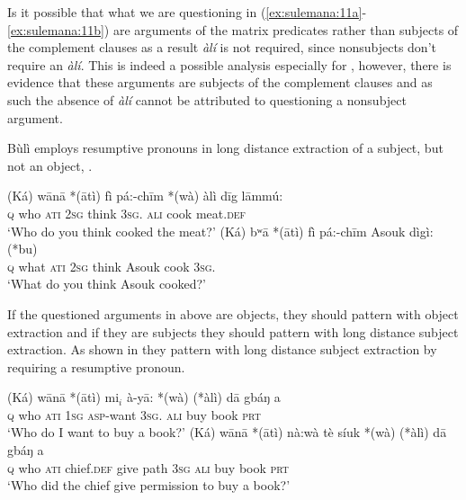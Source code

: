 \documentclass[output=paper,colorlinks,citecolor=brown]{langscibook}
\begin{document}
Is it possible that what we are questioning in (\ref{ex:sulemana:11a}-\ref{ex:sulemana:11b}) are arguments of the matrix predicates rather than subjects of the complement clauses as a result {\it{àlí}} is not required, since nonsubjects don't require an {\it{àlí}}. This is indeed a possible analysis especially for , however, there is evidence that these arguments are subjects of the complement clauses and as such the absence of {\it{àlí}} cannot be attributed to questioning a nonsubject argument. 

Bùlì employs resumptive pronouns in long distance extraction of a subject,  but not an object, .  

\ea%
    \label{ex:sulemana:12}
    \ea%
    \label{ex:sulemana:12a}
    \gll    (Ká) wānā *(ātì) fì pá:-chīm *(wà) àlì dīg lāmmú: \\
            \textsc{q} who \textsc{ati}   \textsc{2sg}  think   \textsc{3sg}.  \textsc{ali} cook  meat.\textsc{def}\\
    \glt    `Who do you think cooked the meat?'
    \ex%
    \label{ex:sulemana:12b}
    \gll    (Ká) bʷā *(ātì) fì pá:-chīm Asouk dìgì: (*bu)  \\
            \textsc{q} what \textsc{ati}  \textsc{2sg} think Asouk  cook   \textsc{3sg}. \\
    \glt    `What do you think Asouk cooked?'
    \z
\z

If the questioned arguments in  above are objects, they should pattern with object extraction and if they are subjects they should pattern with long distance subject extraction. As shown in  they pattern with long distance subject extraction by requiring a resumptive pronoun. 

\ea%
    \label{ex:sulemana:13}
    \ea%
    \label{ex:sulemana:13a}
    \gll    (Ká) wānā *(ātì) mi$_i$ à-yā: *(wà)  (*àlì) dā gbáŋ a \\
            \textsc{q} who \textsc{ati}   \textsc{1sg} \textsc{asp}-want \textsc{3sg}.   \textsc{ali}  buy book \textsc{prt} \\
    \glt    `Who do I want  to buy a book?'
    \ex%
    \label{ex:sulemana:13b}
    \gll    (Ká) wānā *(ātì) nà:wà tè síuk  *(wà) (*àlì) dā gbáŋ a \\
            \textsc{q} who \textsc{ati}  chief.\textsc{def} give path  \textsc{3sg} \textsc{ali} buy book \textsc{prt}\\
    \glt    `Who did the chief give permission to buy a book?'
    \z
\z
\end{document}
